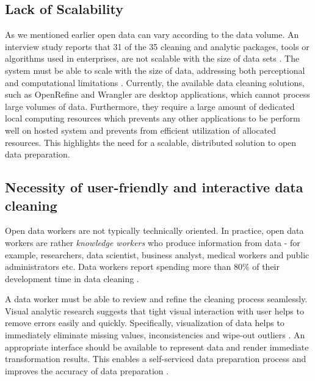 \subsection{Lack of Scalability}
\noindent As we mentioned earlier open data can vary according to the data volume. An interview study reports that 31 of the 35 cleaning and analytic packages, tools or algorithms used in enterprises, are not scalable with the size of data sets \cite{2012-enterprise-analysis-interviews}. The system must be able to scale with the size of data, addressing both perceptional and computational limitations \cite{2012-enterprise-analysis-interviews}. Currently, the available data cleaning solutions, such as  OpenRefine \cite{openrefine}  and Wrangler \cite{2011-wrangler} are desktop applications, which cannot process large volumes of data. Furthermore, they require a large amount of dedicated local computing resources which prevents any other applications to be perform well on hosted system and prevents from efficient utilization of allocated resources. This highlights the need for a scalable, distributed solution to open data preparation. 
\subsection{Necessity of user-friendly and interactive data cleaning}
\noindent 
Open data workers are not typically technically oriented. In practice, open data workers are rather \textit{knowledge workers} who produce information from data - for example, researchers, data scientist, business analyst, medical workers and public administrators etc. Data workers report spending more than 80\% of their development time in data cleaning \cite{visualizationsandtransformationsinwrangling}\cite{Wisteria}\cite{journals/corr/KrishnanW0FG16}.

A data worker must be able to review and refine the cleaning process seamlessly. Visual analytic research \cite{Keim08visualanalytics:} suggests that tight visual interaction with user helps to remove errors easily and quickly. Specifically, visualization of data helps to immediately eliminate missing values, inconsistencies and wipe-out outliers \cite{visualizationsandtransformationsinwrangling}. An appropriate interface should be available to represent data and render immediate transformation results. This enables a self-serviced data preparation process and improves the accuracy of data preparation \cite{journals/corr/KrishnanW0FG16}. 

